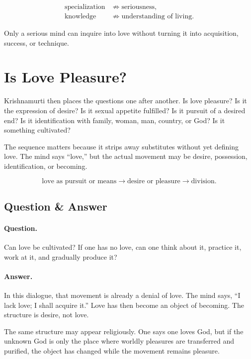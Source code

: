 \documentclass[11pt,oneside]{book}
\begin{document}
\begin{align}
\text{specialization} &\not\Longrightarrow \text{seriousness},\\
\text{knowledge} &\not\Longrightarrow \text{understanding of living}.
\end{align}

Only a serious mind can inquire into love without turning it into acquisition, success, or technique.

\section{Is Love Pleasure?}

Krishnamurti then places the questions one after another. Is love pleasure? Is it the expression of desire? Is it sexual appetite fulfilled? Is it pursuit of a desired end? Is it identification with family, woman, man, country, or God? Is it something cultivated?

The sequence matters because it strips away substitutes without yet defining love. The mind says ``love,'' but the actual movement may be desire, possession, identification, or becoming.

\begin{equation}
\text{love as pursuit or means}
\longrightarrow
\text{desire or pleasure}
\longrightarrow
\text{division}.
\end{equation}

\subsection{Question \& Answer}

\paragraph{Question.}
Can love be cultivated? If one has no love, can one think about it, practice it, work at it, and gradually produce it?

\paragraph{Answer.}
In this dialogue, that movement is already a denial of love. The mind says, ``I lack love; I shall acquire it.'' Love has then become an object of becoming. The structure is desire, not love.

The same structure may appear religiously. One says one loves God, but if the unknown God is only the place where worldly pleasures are transferred and purified, the object has changed while the movement remains pleasure.
\end{document}
